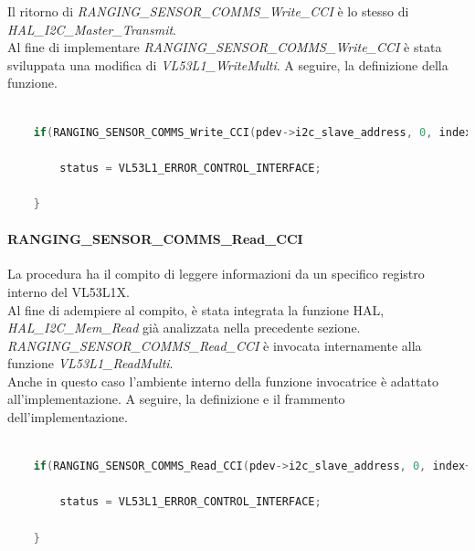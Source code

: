 Il ritorno di \textit{RANGING\_SENSOR\_COMMS\_Write\_CCI} è lo stesso di \textit{HAL\_I2C\_Master\_Transmit}.\\
Al fine di implementare \textit{RANGING\_SENSOR\_COMMS\_Write\_CCI} è stata sviluppata una modifica di \textit{VL53L1\_WriteMulti}.
A seguire, la definizione della funzione.

\begin{lstlisting}[language=Cpp, caption={Dettaglio sull'implementazione di \textit{RANGING\_SENSOR\_COMMS\_Write\_CCI} in \textit{VL53L1\_WriteMulti} }]
    
    if(RANGING_SENSOR_COMMS_Write_CCI(pdev->i2c_slave_address, 0, index+position, pdata+position, data_size) != HAL_OK){
        
        status = VL53L1_ERROR_CONTROL_INTERFACE;

    }

\end{lstlisting}

\paragraph{RANGING\_SENSOR\_COMMS\_Read\_CCI}
La procedura ha il compito di leggere informazioni da un specifico registro interno del VL53L1X.\\
Al fine di adempiere al compito, è stata integrata la funzione HAL, \textit{HAL\_I2C\_Mem\_Read} già analizzata nella precedente sezione.
\textit{RANGING\_SENSOR\_COMMS\_Read\_CCI} è invocata internamente alla funzione \textit{VL53L1\_ReadMulti}.\\
Anche in questo caso l'ambiente interno della funzione invocatrice è adattato all'implementazione.
A seguire, la definizione e il frammento dell'implementazione.

\begin{lstlisting}[language=Cpp, caption={Dettaglio sull'implementazione di \textit{RANGING\_SENSOR\_COMMS\_Read\_CCI} in \textit{VL53L1\_ReadMulti}}]
    
    if(RANGING_SENSOR_COMMS_Read_CCI(pdev->i2c_slave_address, 0, index+position, pData+position, data_size) != HAL_OK){

        status = VL53L1_ERROR_CONTROL_INTERFACE;

    }

\end{lstlisting}
